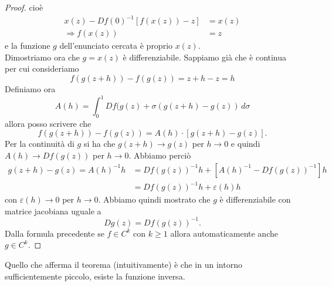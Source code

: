 \begin{proof}
cioè 
\begin{align*}
x(z)-Df(0)^{-1}[f(x(z))-z] & = x(z) \\ \Rightarrow
f(x(z)) & = z
\end{align*}
e la funzione $g$ dell'enunciato cercata è proprio $x(z)$.\\
Dimostriamo ora che $g=x(z)$ è differenziabile. Sappiamo già che è continua per cui consideriamo
\begin{equation*}
f(g(z+h))-f(g(z)) = z+h-z = h
\end{equation*}
Definiamo ora
\begin{equation*}
A(h) = \int_{0}^{1}Df(g(z)+\sigma (g(z+h)-g(z))\,d\sigma
\end{equation*}
allora posso scrivere che
\begin{equation*}
    f(g(z+h))-f(g(z)) = A(h) \cdot [g(z+h)-g(z)].
\end{equation*}
Per la continuità di $g$ si ha che $g(z+h)\rightarrow g(z)$ per $h\rightarrow 0$ e quindi $A(h)\rightarrow Df(g(z))$ per $h\rightarrow 0$.
Abbiamo perciò
\begin{align*}
g(z+h)-g(z)=A(h)^{-1}h & = Df(g(z))^{-1}h+[A(h)^{-1}-Df(g(z))^{-1}]h \\
                         & = Df(g(z))^{-1}h+\varepsilon(h)h
\end{align*}
con $\varepsilon(h)\rightarrow 0$ per $h\rightarrow 0$. Abbiamo quindi mostrato che $g$ è differenziabile con matrice jacobiana uguale a
\begin{equation*}
Dg(z)=Df(g(z))^{-1}.
\end{equation*}
Dalla formula precedente se $f\in C^{k}$ con $k\geq 1$ allora automaticamente anche $g\in C^{k}$.
\end{proof}
Quello che afferma il teorema (intuitivamente) è che in un intorno sufficientemente piccolo, esiste la funzione inversa. \\


